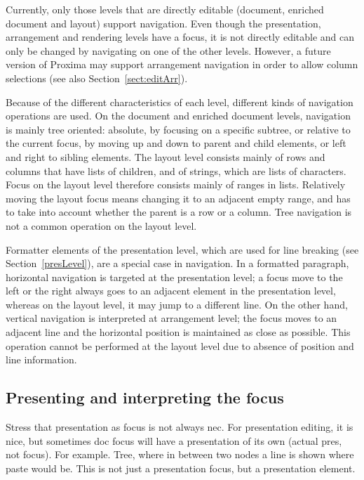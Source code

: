 Currently, only those levels that are directly editable (document, enriched document and layout) support navigation. Even though the presentation, arrangement and rendering levels have a focus, it is not directly editable and can only be changed by navigating on one of the other levels. However, a future version of Proxima may support arrangement navigation in order to allow column selections (see also Section~\ref{sect:editArr}).

Because of the different characteristics of each level, different kinds of navigation operations are used. On the document and enriched document levels, navigation is mainly tree oriented: absolute, by focusing on a specific subtree, or relative to the current focus, by moving up and down to parent and child elements, or left and right to sibling elements. The layout level consists mainly of rows and columns that have lists of children, and of strings, which are lists of characters. Focus on the layout level therefore consists mainly of ranges in lists. Relatively moving the layout focus means changing it to an adjacent empty range, and has to take into account whether the parent is a row or a column. Tree navigation is not a common operation on the layout level.


Formatter elements of the presentation level, which are used for line breaking (see Section~\ref{presLevel}), are a special case in navigation. In a formatted paragraph, horizontal navigation is targeted at the presentation level; a focus move to the left or the right always goes to an adjacent element in the presentation level, whereas on the layout level, it may jump to a different line. On the other hand, vertical navigation is interpreted at arrangement level; the focus moves to an adjacent line and the horizontal position is maintained as close as possible. This operation cannot be performed at the layout level due to absence of position and line information. 
 
 
%																
\subsection{Presenting and interpreting the focus}

\bc
Stress that presentation as focus is not always nec. For presentation editing, it is nice, but sometimes doc
focus will have a presentation of its own (actual pres, not focus). For example. Tree, where in between two nodes a line is shown where paste would be. This is not just a presentation focus, but a presentation element.
\ec 

